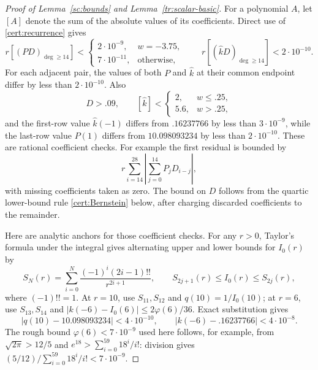 \documentclass[11pt]{article}
\theoremstyle{definition}
\theoremstyle{remark}
\numberwithin{equation}{section}
\begin{document}
\begin{proof}[Proof of Lemma~\ref{sc:bounds} and Lemma~\ref{tr:scalar-basic}]
For a polynomial $A$, let $[A]$ denote the sum of the absolute values of
its coefficients. Direct use of \eqref{cert:recurrence} gives
\begin{equation}\label{cert:residuals}
 r[(PD)_{\deg\ge14}]<
 \begin{cases}2\cdot10^{-9},&w=-3.75,\\7\cdot10^{-11},&\text{otherwise},\end{cases}
 \qquad r[(\widehat k D)_{\deg\ge14}]<2\cdot10^{-10}.
\end{equation}
For each adjacent pair, the values of both $P$ and $\widehat k$ at their common
endpoint differ by less than $2\cdot10^{-10}$. Also
\begin{equation}\label{cert:additional-poly}
 D>.09,\qquad [\widehat k]<\begin{cases}2,&w\le.25,\\5.6,&w>.25,
 \end{cases}
\end{equation}
and the first-row value $\widehat k(-1)$ differs from $.16237766$ by less than
$3\cdot10^{-9}$, while the last-row value $P(1)$ differs from
$10.098093234$ by less than $2\cdot10^{-10}$.
These are rational coefficient checks. For example the first residual is
bounded by
\[
 r\sum_{i=14}^{28}\left|\sum_{j=0}^{14}P_jD_{i-j}\right|,
\]
with missing coefficients taken as zero. The bound on $D$ follows from
the quartic lower-bound rule \eqref{cert:Bernstein} below, after charging
discarded coefficients to the remainder.

Here are analytic anchors for those coefficient checks. For any $r>0$,
Taylor's formula under the integral gives alternating upper and lower
bounds for $I_0(r)$ by
\begin{equation}\label{cert:Mills}
 S_N(r)=\sum_{i=0}^{N}\frac{(-1)^i(2i-1)!!}{r^{2i+1}},
 \qquad S_{2j+1}(r)\le I_0(r)\le S_{2j}(r),
\end{equation}
where $(-1)!!=1$. At $r=10$, use $S_{11},S_{12}$ and $q(10)=1/I_0(10)$;
at $r=6$, use $S_{13},S_{14}$ and
$|k(-6)-I_0(6)|\le2\varphi(6)/36$. Exact substitution gives
\[
 |q(10)-10.098093234|<4\cdot10^{-10},\qquad
 |k(-6)-.16237766|<4\cdot10^{-8}.
\]
The rough bound $\varphi(6)<7\cdot10^{-9}$ used here follows, for example,
from $\sqrt{2\pi}>12/5$ and
$e^{18}>\sum_{i=0}^{59}18^i/i!$: division gives
$(5/12)/\sum_{i=0}^{59}18^i/i!<7\cdot10^{-9}$.


\end{proof}
\end{document}
